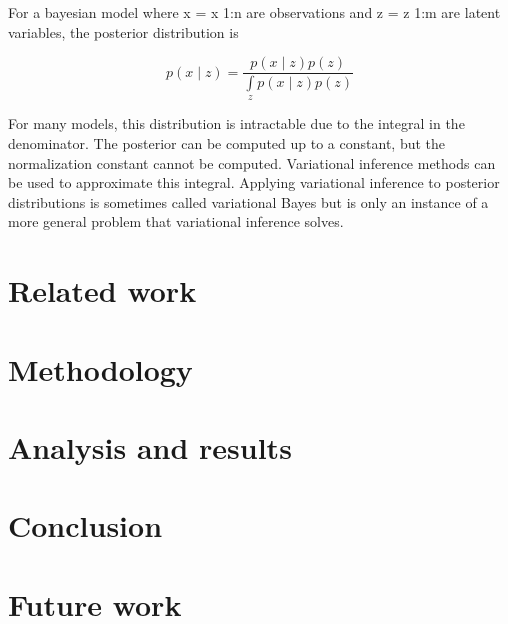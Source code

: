 \documentclass[12pt]{report}
\begin{document}
For a bayesian model where x = x 1:n are observations and z = z 1:m are latent
variables, the posterior distribution is

\begin{equation}
p(x \mid z) = \frac{p(x \mid z) p(z)}{\int\limits_{z} p(x \mid z)p(z)}
\end{equation}

For many models, this distribution is intractable due to the integral in the
denominator. The posterior can be computed up to a constant, but the
normalization constant cannot be computed. Variational inference methods can be
used to approximate this integral. Applying variational inference to posterior
distributions is sometimes called variational Bayes but is only an instance of
a more general problem that variational inference solves.


\section{Related work}

\section{Methodology}

\section{Analysis and results}

\section{Conclusion}

\section{Future work}
\end{document}
